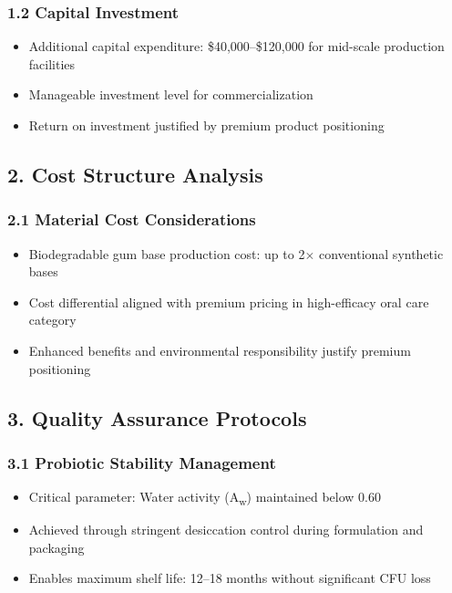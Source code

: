 \documentclass[12pt]{article}
\begin{document}
\subsubsection*{1.2 Capital Investment}
\begin{itemize}
    \item Additional capital expenditure: \$40,000--\$120,000 for mid-scale production facilities
    \item Manageable investment level for commercialization
    \item Return on investment justified by premium product positioning
\end{itemize}

\subsection*{2. Cost Structure Analysis}
\subsubsection*{2.1 Material Cost Considerations}
\begin{itemize}
    \item Biodegradable gum base production cost: up to 2$\times$ conventional synthetic bases
    \item Cost differential aligned with premium pricing in high-efficacy oral care category
    \item Enhanced benefits and environmental responsibility justify premium positioning
\end{itemize}

\subsection*{3. Quality Assurance Protocols}

\subsubsection*{3.1 Probiotic Stability Management}
\begin{itemize}
    \item Critical parameter: Water activity (A\textsubscript{w}) maintained below 0.60
    \item Achieved through stringent desiccation control during formulation and packaging
    \item Enables maximum shelf life: 12--18 months without significant CFU loss
\end{itemize}
\end{document}
